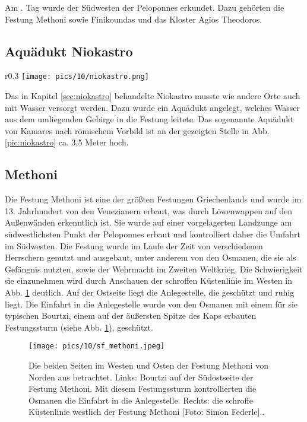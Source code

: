 \documentclass[preprint]{geomorphica} %
\begin{document}
Am \theday. Tag wurde der Südwesten der Peloponnes erkundet. Dazu gehörten die Festung Methoni sowie Finikoundas und das Kloster Agios Theodoros.

\subsection{Aquädukt Niokastro}

\begin{wrapfigure}{r}{0.3\textwidth}
    \vspace{-10mm}
    \centering
    \texttt{[image: pics/10/niokastro.png]}
    \caption{Aquädukt des Niokastro.}
    \label{pic:niokastro}
    \vspace{-10mm}
\end{wrapfigure}

Das in Kapitel \ref{sec:niokastro} behandelte Niokastro musste wie andere Orte auch mit Wasser versorgt werden. Dazu wurde ein Aquädukt angelegt, welches Wasser aus dem umliegenden Gebirge in die Festung leitete. Das sogenannte Aquädukt von Kamares nach römischem Vorbild ist an der gezeigten Stelle in Abb. \ref{pic:niokastro} ca. 3,5 Meter hoch.

\subsection{Methoni}

Die Festung Methoni ist eine der größten Festungen Griechenlands und wurde im 13. Jahrhundert von den Venezianern erbaut, was durch Löwenwappen auf den Außenwänden erkenntlich ist. Sie wurde auf einer vorgelagerten Landzunge am südwestlichsten Punkt der Peloponnes erbaut und kontrolliert daher die Umfahrt im Südwesten. Die Festung wurde im Laufe der Zeit von verschiedenen Herrschern genutzt und ausgebaut, unter anderem von den Osmanen, die sie als Gefängnis nutzten, sowie der Wehrmacht im Zweiten Weltkrieg. Die Schwierigkeit sie einzunehmen wird durch Anschauen der schroffen Küstenlinie im Westen in Abb. \ref{pic:methoni} deutlich. Auf der Ostseite liegt die Anlegestelle, die geschützt und ruhig liegt. Die Einfahrt in die Anlegestelle wurde von den Osmanen mit einem für sie typischen Bourtzi, einem auf der äußersten Spitze des Kaps erbauten Festungssturm (siehe Abb. \ref{pic:methoni}), geschützt.

\begin{figure}[h]
    \centering
    \texttt{[image: pics/10/sf\_methoni.jpeg]}
    \caption{Die beiden Seiten im Westen und Osten der Festung Methoni von Norden aus betrachtet. Links: Bourtzi auf der Südostseite der Festung Methoni. Mit diesem Festungssturm kontrollierten die Osmanen die Einfahrt in die Anlegestelle. Rechts: die schroffe Küstenlinie westlich der Festung Methoni [Foto: Simon Federle]..}
    \label{pic:methoni}
\end{figure}
\end{document}
